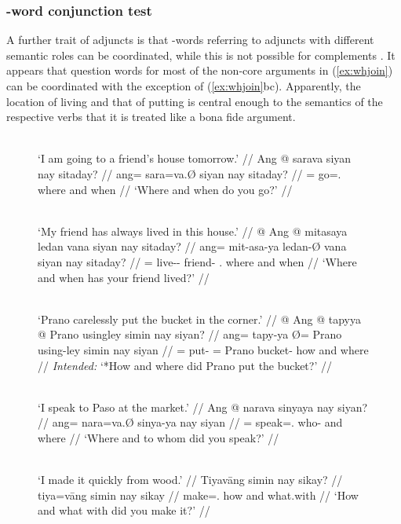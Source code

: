 \subsubsection{-word conjunction test}

A further trait of adjuncts is that -words referring to adjuncts with
different semantic roles can be coordinated, while this is not possible for
complements \citep[408]{needhamtoivonen2011}. It appears that question words
for most of the non-core arguments in (\ref{ex:whjoin}) can be coordinated with
the exception of (\ref{ex:whjoin}bc). Apparently, the location of living and
that of putting is central enough to the semantics of the respective verbs that
it is treated like a bona fide argument.

\begin{figure}
\pex\label{ex:whjoin}
\a\label{ex:whjoin_1}\begingl
	\glpreamble {}\\
		`I am going to a friend's house tomorrow.' //
	\gla Ang @ sarava siyan nay sitaday? //
	\glb ang= sara=va.Ø siyan nay sitaday? //
	\glc \AgtT{}= go=\Second{}.\Top{} where and when //
	\glft `Where and when do you go?' //
\endgl

\a\label{ex:whjoin_2}\begingl
	\glpreamble {}\\
		`My friend has always lived in this house.' //
	\gla * @ Ang @ mitasaya ledan vana siyan nay sitaday? //
	\glb {} ang= mit-asa-ya ledan-Ø vana siyan nay sitaday? //
	\glc {} \AgtT{}= live-\Hab{}-\TsgM{} friend-\Top{} \Second{}.\Gen{} where
		and when //
	\glft `Where and when has your friend lived?' //
\endgl

\a\label{ex:whjoin_3}\begingl
	\glpreamble {}\\
		`Prano carelessly put the bucket in the corner.' //
	\gla * @ Ang @ tapyya {} @ Prano usingley simin nay siyan? //
	\glb {} ang= tapy-ya Ø= Prano using-ley simin nay siyan //
	\glc {} \AgtT{}= put-\TsgM{} \Top{}= Prano bucket-\PargI{} how and where //
	\glft \textit{Intended:} `*How and where did Prano put the bucket?' //
\endgl

\a\label{ex:whjoin_4}\begingl
	\glpreamble {}\\
		`I speak to Paso at the market.' //
	\gla Ang @ narava sinyaya nay siyan? //
	\glb ang= nara=va.Ø sinya-ya nay siyan //
	\glc \AgtT{}= speak=\Second{}.\Top{} who-\Loc{} and where //
	\glft `Where and to whom did you speak?' //
\endgl

\a\label{ex:whjoin_5}\begingl
	\glpreamble {}\\
		`I made it quickly from wood.' //
	\gla Tiyavāng simin nay sikay? //
	\glb tiya=vāng simin nay sikay //
	\glc make=\Second{}.\AgtT{} how and what.with //
	\glft `How and what with did you make it?' //
\endgl

\xe
\end{figure}

